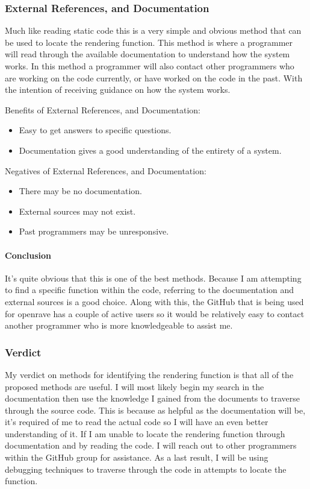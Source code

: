 \documentclass[10pt,journal,compsoc,draftclsnofoot]{IEEEtran}
\begin{document}
\subsubsection{External References, and Documentation}
Much like reading static code this is a very simple and obvious method that can be used to locate the rendering function.
This method is where a programmer will read through the available documentation to understand how the system works.
In this method a programmer will also contact other programmers who are working on the code currently, or have worked on the code in the past.
With the intention of receiving guidance on how the system works.

Benefits of External References, and Documentation:
\begin{itemize}
\item Easy to get answers to specific questions.
\item Documentation gives a good understanding of the entirety of a system.
\end{itemize}

Negatives of External References, and Documentation:
\begin{itemize}
\item There may be no documentation.
\item External sources may not exist.
\item Past programmers may be unresponsive.
\end{itemize}

\paragraph{Conclusion}
\vspace{3mm}
It's quite obvious that this is one of the best methods.
Because I am attempting to find a specific function within the code, referring to the documentation and external sources is a good choice.
Along with this, the GitHub that is being used for openrave has a couple of active users so it would be relatively easy to contact another programmer who is more knowledgeable to assist me.

\subsubsection{Verdict}
My verdict on methods for identifying the rendering function is that all of the proposed methods are useful.
I will most likely begin my search in the documentation then use the knowledge I gained from the documents to traverse through the source code.
This is because as helpful as the documentation will be, it's required of me to read the actual code so I will have an even better understanding of it.
If I am unable to locate the rendering function through documentation and by reading the code.
I will reach out to other programmers within the GitHub group for assistance.
As a last result, I will be using debugging techniques to traverse through the code in attempts to locate the function.
\end{document}
